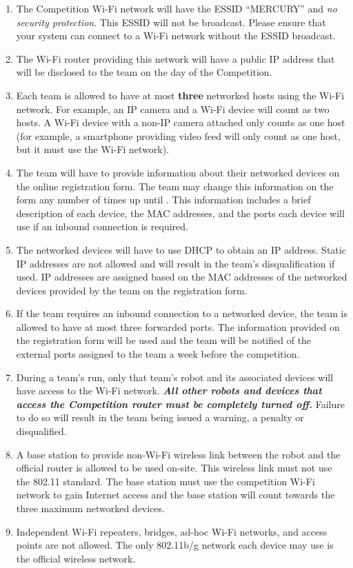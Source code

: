 \begin{enumerate}
\item The Competition Wi-Fi network will have the ESSID “MERCURY” and \textit{no security protection}. This ESSID will not be broadcast. Please ensure that your system can connect to a Wi-Fi network without the ESSID broadcast.
\item The Wi-Fi router providing this network will have a public IP address that will be disclosed to the team on the day of the Competition.
\item Each team is allowed to have at most \textbf{three} networked hosts using the Wi-Fi network. For example, an IP camera and a Wi-Fi device will count as two hosts. A Wi-Fi device with a non-IP camera attached only counts as one host (for example, a smartphone providing video feed will only count as one host, but it must use the Wi-Fi network).
\item The team will have to provide information about their networked devices on the online registration form. The team may change this information on the form any number of times up until \textbf{\network}. This information includes a brief description of each device, the MAC addresses, and the ports each device will use if an inbound connection is required.
\item The networked devices will have to use DHCP to obtain an IP address. Static IP addresses are not allowed and will result in the team's disqualification if used. IP addresses are assigned based on the MAC addresses of the networked devices provided by the team on the registration form.
\item If the team requires an inbound connection to a networked device, the team is allowed to have at most three forwarded ports. The information provided on the registration form will be used and the team will be notified of the external ports assigned to the team a week before the competition.
\item During a team's run, only that team's robot and its associated devices will have access to the Wi-Fi network. \textbf{\textit{All other robots and devices that access the Competition router must be completely turned off.}} Failure to do so will result in the team being issued a warning, a penalty or disqualified.
\item A base station to provide non-Wi-Fi wireless link between the robot and the official router is allowed to be used on-site. This wireless link must not use the 802.11 standard. The base station must use the competition Wi-Fi network to gain Internet access and the base station will count towards the three maximum networked devices.
\item Independent Wi-Fi repeaters, bridges, ad-hoc Wi-Fi networks, and access points are not allowed. The only 802.11b/g network each device may use is the official wireless network.
\end{enumerate}

